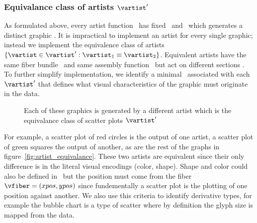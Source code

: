 \documentclass[../main.tex]{subfiles}
\begin{document}
\subsubsection{Equivalance class of artists $\vartist^{\prime}$}
\label{sec:artist_equivalance}
As formulated above, every artist function \vartist\ has fixed \vchannel\ and \vmark\ which  generates a distinct graphic \gsection. It is impractical to implement an artist for every single graphic; instead we implement the equivalence class of artists $\{\vartist \in \vartist^{\prime}: \vartist_{1} \equiv \vartist_{2}\}$. Equivalent artists have the same fiber bundle \vtotal\ and same assembly function \vmark\, but act on different sections \vsection. To further simplify implementation, we identify a minimal \vfiber\ associated with each $\vartist^{\prime}$ that defines what visual characteristics of the graphic must originate in the data. 
\begin{figure}
    \caption{Each of these graphics is generated by a different artist \vartist which is the equivalance class of scatter plots $\vartist^{\prime}$}
    \label{fig:artist_equivalence}
\end{figure}
For example, a scatter plot of red circles is the output of one artist, a scatter plot of green squares the output of another, as are the rest of the graphs in figure~\ref{fig:artist_equivalance}. These two artists are equivalent since their only difference is in the literal visual encodings (color, shape). Shape and color could also be defined in \vmark\, but the position must come from the fiber $\vfiber=(xpos,ypos)$ since fundementally a scatter plot is the plotting of one position against another\cite{friendlyBriefHistoryData2008}. We also use this criteria to identify derivative types, for example the bubble chart\cite{tufteVisualDisplayQuantitative2001} is a type of scatter where by definition the glyph size is mapped from the data. 
\end{document}
